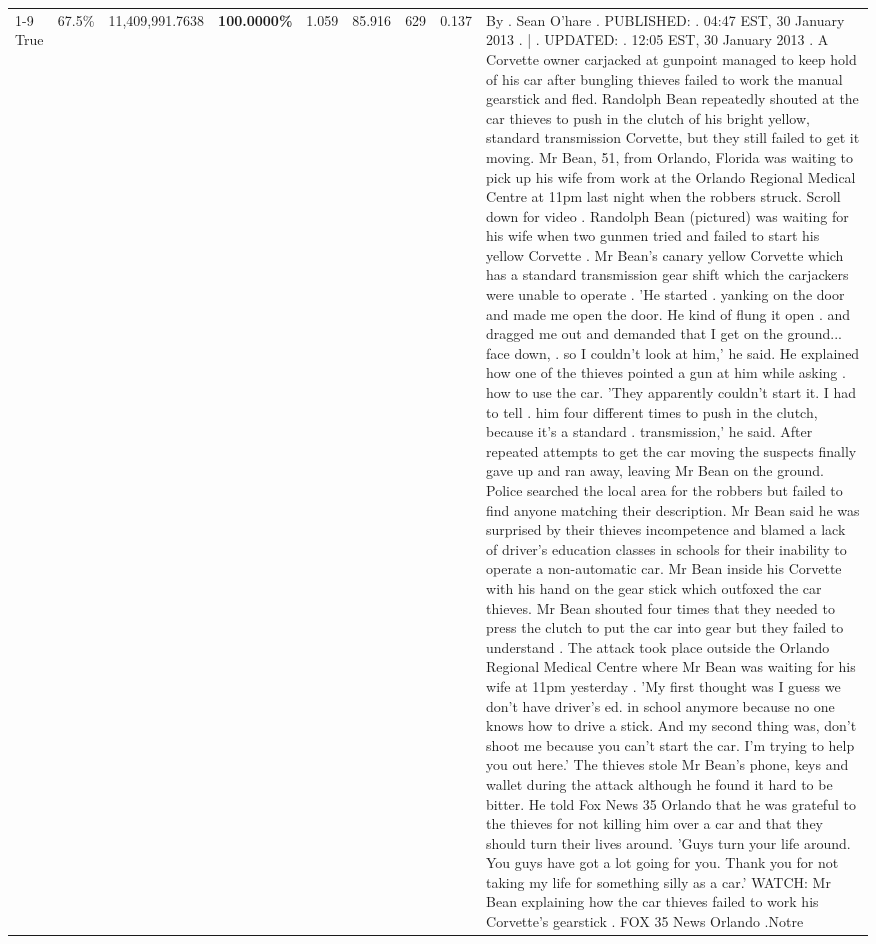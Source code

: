 \begin{table}[H]
\begin{tabular}{lllrlllll}
\cline{1-9} \cline{2-9}
True & 67.5\% & 11,409,991.7638 & \bfseries \color{red} 100.0000\% & 1.059 & 85.916 & 629 & 0.137 & By . Sean O'hare . PUBLISHED: . 04:47 EST, 30 January 2013 . | . UPDATED: . 12:05 EST, 30 January 2013 . A Corvette owner carjacked at gunpoint managed to keep hold of his car after bungling thieves failed to work the manual gearstick and fled. Randolph Bean repeatedly shouted at the car thieves to push in the clutch of his bright yellow, standard transmission Corvette, but they still failed to get it moving. Mr Bean, 51, from Orlando, Florida was waiting to pick up his wife from work at the Orlando Regional Medical Centre at 11pm last night when the robbers struck. Scroll down for video . Randolph Bean (pictured) was waiting for his wife when two gunmen tried and failed to start his yellow Corvette . Mr Bean's canary yellow Corvette which has a standard transmission gear shift which the carjackers were unable to operate . 'He started . yanking on the door and made me open the door. He kind of flung it open . and dragged me out and demanded that I get on the ground... face down, . so I couldn't look at him,' he said. He explained how one of the thieves pointed a gun at him while asking . how to use the car. 'They apparently couldn't start it. I had to tell . him four different times to push in the clutch, because it's a standard . transmission,' he said. After repeated attempts to get the car moving the suspects finally gave up and ran away, leaving Mr Bean on the ground. Police searched the local area for the robbers but failed to find anyone matching their description. Mr Bean said he was surprised by their thieves incompetence and blamed a lack of driver's education classes in schools for their inability to operate a non-automatic car. Mr Bean inside his Corvette with his hand on the gear stick which outfoxed the car thieves. Mr Bean shouted four times that they needed to press the clutch to put the car into gear but they failed to understand . The attack took place outside the Orlando Regional Medical Centre where Mr Bean was waiting for his wife at 11pm yesterday . 'My first thought was I guess we don't have driver's ed. in school anymore because no one knows how to drive a stick. And my second thing was, don't shoot me because you can't start the car. I'm trying to help you out here.' The thieves stole Mr Bean's phone, keys and wallet during the attack although he found it hard to be bitter. He told Fox News 35 Orlando that he was grateful to the thieves for not killing him over a car and that they should turn their lives around. 'Guys turn your life around. You guys have got a lot going for you. Thank you for not taking my life for something silly as a car.' WATCH: Mr Bean explaining how the car thieves failed to work his Corvette's gearstick . FOX 35 News Orlando .Notre \\

\end{tabular}
\end{table}
